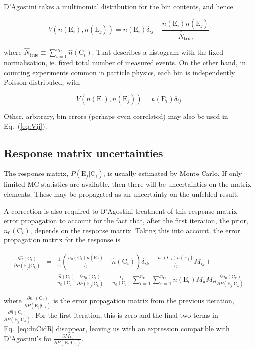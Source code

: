 \documentclass[12pt,a4paper]{article}
\newcommand{\E}{\mathrm{E}}
\newcommand{\C}{\mathrm{C}}
\newcommand{\dd}[2]{\frac{\partial{#1}}{\partial{#2}}}
\begin{document}
D'Agostini takes a multinomial distribution for the bin contents, and hence

\begin{equation}
V(n(\E_i),n(\E_j)) = n(\E_i) \delta_{ij} - \frac{n(\E_i) n(\E_j)}{\hat{N}_{\mathrm{true}}}
\end{equation}

where $\hat{N}_{\mathrm{true}} \equiv \sum_{i=1}^{n_{\C}} \hat{n}(\C_i)$.
That describes a histogram with the fixed normalisation, ie. fixed total number of measured events.
On the other hand, in counting experiments common in particle physics, each bin is independently Poisson distributed, with

\begin{equation}
V(n(\E_i),n(\E_j)) = n(\E_i) \delta_{ij}
\end{equation}

Other, arbitrary, bin errors (perhaps even correlated) may also be used in Eq.~(\ref{eq:Vij}).

\subsection{Response matrix uncertainties}

The response matrix, $P(\E_j|\C_i)$, is usually estimated by Monte Carlo. If only limited MC statistics
are available, then there will be uncertainties on the matrix elements.
These may be propagated as an uncertainty on the unfolded result.

A correction is also required to D'Agostini treatment of this response matrix error propagation
to account for the fact that, after the first iteration, the prior, $n_0(\C_i)$, depends on the response matrix.
Taking this into account, the error propagation matrix for the response is

\begin{eqnarray}
\dd{\hat{n}(\C_i)}{P(\E_j|\C_k)} & = & \frac{1}{\epsilon_i} \left( \frac{n_0(\C_i) n(\E_j)}{f_j} - \hat{n}(\C_i) \right) \delta_{ik}  - \frac{n_0(\C_k) n(\E_j)}{f_j} M_{ij} + \nonumber \\
& & \frac{\hat{n}(\C_i)}{n_0(\C_i)} \dd{n_0(\C_i)}{P(\E_j|\C_k)} - \frac{\epsilon_i}{n_0(\C_i)} \sum_{l=1}^{n_{\E}} \sum_{r=1}^{n_{\C}} n(\E_l) M_{il} M_{rl} \dd{n_0(\C_r)}{P(\E_j|\C_k)}
\label{eq:dnCidR}
\end{eqnarray}

where $\dd{n_0(\C_i)}{P(\E_j|\C_k)}$ is the error propagation matrix from the previous iteration,
$\dd{\hat{n}(\C_i)}{P(\E_j|\C_k)}$. For the first iteration, this is zero and the final two terms in
Eq.~\ref{eq:dnCidR} disappear, leaving us with an expression compatible with D'Agostini's for $\dd{M_{ki}}{P(\E_r|\C_u)}$.
\end{document}
